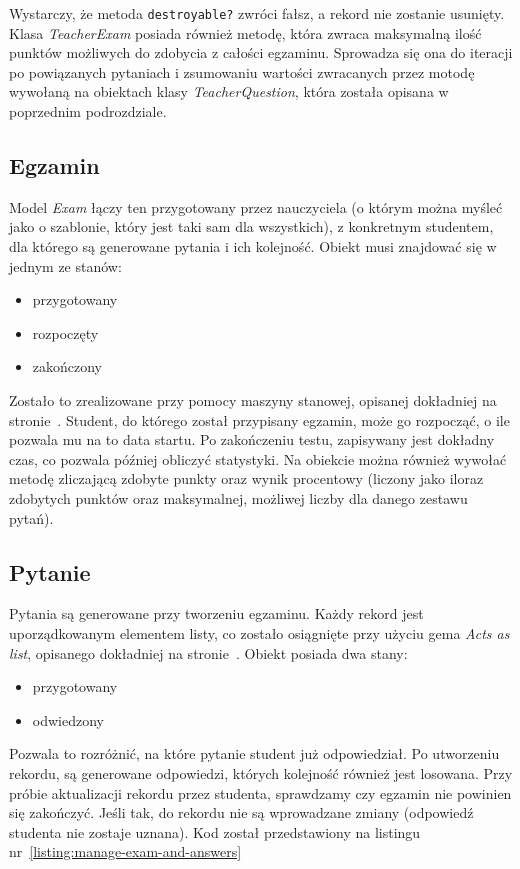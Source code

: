 \documentclass[12pt,twoside]{report}
\begin{document}
Wystarczy, że metoda \texttt{destroyable?} zwróci fałsz, a rekord nie zostanie usunięty.
Klasa \emph{TeacherExam} posiada również metodę, która zwraca maksymalną ilość punktów
możliwych do zdobycia z całości egzaminu. Sprowadza się ona do iteracji po powiązanych
pytaniach i zsumowaniu wartości zwracanych przez motodę wywołaną na obiektach
klasy \emph{TeacherQuestion}, która została opisana w poprzednim podrozdziale.

\subsection{Egzamin}
Model \emph{Exam} łączy ten przygotowany przez nauczyciela (o którym można myśleć jako
o szablonie, który jest taki sam dla wszystkich), z konkretnym studentem, dla którego są
generowane pytania i ich kolejność. Obiekt musi znajdować się w jednym ze stanów:

\begin{itemize}
  \item{przygotowany}
  \item{rozpoczęty}
  \item{zakończony}
\end{itemize}


Zostało to zrealizowane przy pomocy maszyny stanowej, opisanej dokładniej na
stronie~\pageref{sec:state_machine}. Student, do którego został przypisany egzamin, może
go rozpocząć, o ile pozwala mu na to data startu. Po zakończeniu testu, zapisywany jest
dokładny czas, co pozwala później obliczyć statystyki. Na obiekcie można również wywołać
metodę zliczającą zdobyte punkty oraz wynik procentowy (liczony jako iloraz zdobytych
punktów oraz maksymalnej, możliwej liczby dla danego zestawu pytań).

\subsection{Pytanie}
Pytania są generowane przy tworzeniu egzaminu. Każdy rekord jest uporządkowanym elementem
listy, co zostało osiągnięte przy użyciu gema \emph{Acts as list}, opisanego dokładniej na
stronie~\pageref{sec:acts_as_list}. Obiekt posiada dwa stany:

\begin{itemize}
  \item{przygotowany}
  \item{odwiedzony}
\end{itemize}


Pozwala to rozróżnić, na które pytanie student już odpowiedział. Po utworzeniu rekordu, są
generowane odpowiedzi, których kolejność również jest losowana. Przy próbie aktualizacji
rekordu przez studenta, sprawdzamy czy egzamin nie powinien się zakończyć. Jeśli tak,
do rekordu nie są wprowadzane zmiany (odpowiedź studenta nie zostaje uznana). Kod został
przedstawiony na listingu nr~\ref{listing:manage-exam-and-answers}
\end{document}
